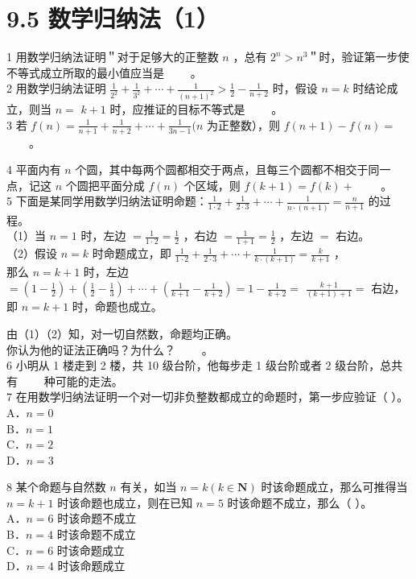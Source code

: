\documentclass[10pt]{article}
\begin{document}
\section*{9.5 数学归纳法（1）}
1 用数学归纳法证明＂对于足够大的正整数 \(n\) ，总有 \(2^{n}>n^{3}\)＂时，验证第一步使不等式成立所取的最小值应当是 \(\qquad\)。\\
2 用数学归纳法证明 \(\frac{1}{2^{2}}+\frac{1}{3^{2}}+\cdots+\frac{1}{(n+1)^{2}}>\frac{1}{2}-\frac{1}{n+2}\) 时，假设 \(n=k\) 时结论成立，则当 \(n=\) \(k+1\) 时，应推证的目标不等式是 \(\qquad\)。\\
3 若 \(f(n)=\frac{1}{n+1}+\frac{1}{n+2}+\cdots+\frac{1}{3 n-1}(n\) 为正整数），则 \(f(n+1)-f(n)=\) \(\qquad\)。

4 平面内有 \(n\) 个圆，其中每两个圆都相交于两点，且每三个圆都不相交于同一点，记这 \(n\) 个圆把平面分成 \(f(n)\) 个区域，则 \(f(k+1)=f(k)+\) \(\qquad\)。\\
5 下面是某同学用数学归纳法证明命题：\(\frac{1}{1 \cdot 2}+\frac{1}{2 \cdot 3}+\cdots+\frac{1}{n \cdot(n+1)}=\frac{n}{n+1}\) 的过程。\\
（1）当 \(n=1\) 时，左边 \(=\frac{1}{1 \cdot 2}=\frac{1}{2}\) ，右边 \(=\frac{1}{1+1}=\frac{1}{2}\) ，左边 \(=\) 右边。\\
（2）假设 \(n=k\) 时命题成立，即 \(\frac{1}{1 \cdot 2}+\frac{1}{2 \cdot 3}+\cdots+\frac{1}{k \cdot(k+1)}=\frac{k}{k+1}\) ，\\
那么 \(n=k+1\) 时，左边 \(=\left(1-\frac{1}{2}\right)+\left(\frac{1}{2}-\frac{1}{3}\right)+\cdots+\left(\frac{1}{k+1}-\frac{1}{k+2}\right)=1-\frac{1}{k+2}=\) \(\frac{k+1}{(k+1)+1}=\) 右边，即 \(n=k+1\) 时，命题也成立。

由（1）（2）知，对一切自然数，命题均正确。\\
你认为他的证法正确吗？为什么？ \(\qquad\)。\\
6 小明从 1 楼走到 2 楼，共 10 级台阶，他每步走 1 级台阶或者 2 级台阶，总共有 \(\qquad\)种可能的走法。\\
7 在用数学归纳法证明一个对一切非负整数都成立的命题时，第一步应验证（ ）。\\
A．\(n=0\)\\
B．\(n=1\)\\
C．\(n=2\)\\
D．\(n=3\)

8 某个命题与自然数 \(n\) 有关，如当 \(n=k(k \in \mathbf{N})\) 时该命题成立，那么可推得当 \(n=k+1\) 时该命题也成立，则在已知 \(n=5\) 时该命题不成立，那么（ ）。\\
A．\(n=6\) 时该命题不成立\\
B．\(n=4\) 时该命题不成立\\
C．\(n=6\) 时该命题成立\\
D．\(n=4\) 时该命题成立
\end{document}
